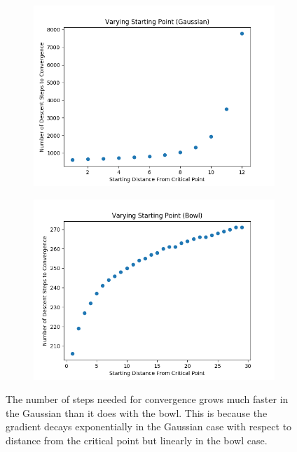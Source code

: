 \documentclass{article}
\begin{document}
\begin{figure}[H]
\centering
        \begin{subfigure}[b]{0.4\textwidth}
                \includegraphics[width=\linewidth]{../P1/figs/start_gauss.png}
        \end{subfigure}%
        \begin{subfigure}[b]{0.4\textwidth}
                \includegraphics[width=\linewidth]{../P1/figs/start_bowl.png}
        \end{subfigure}%
	\caption*{The number of steps needed for convergence grows much faster in the Gaussian than it does with the bowl. This is because the gradient decays exponentially in the Gaussian case with respect to distance from the critical point but linearly in the bowl case.}
\end{figure}
\end{document}
